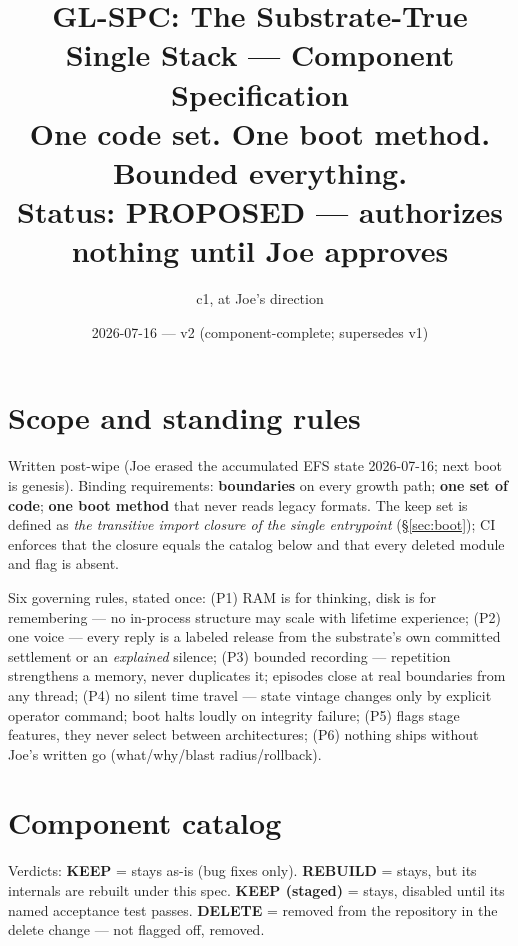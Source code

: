 \documentclass[11pt]{article}
\title{GL-SPC: The Substrate-True Single Stack — Component Specification\\
\large One code set. One boot method. Bounded everything.\\
\normalsize Status: \textbf{PROPOSED — authorizes nothing until Joe approves}}
\author{c1, at Joe's direction}
\date{2026-07-16 — v2 (component-complete; supersedes v1)}
\newcommand{\keep}{\textbf{KEEP}}
\newcommand{\keepstaged}{\textbf{KEEP (staged)}}
\newcommand{\rebuild}{\textbf{REBUILD}}
\newcommand{\del}{\textbf{DELETE}}
\begin{document}
\maketitle

\section{Scope and standing rules}

Written post-wipe (Joe erased the accumulated EFS state 2026-07-16; next boot
is genesis). Binding requirements: \textbf{boundaries} on every growth path;
\textbf{one set of code}; \textbf{one boot method} that never reads legacy
formats. The keep set is defined as \emph{the transitive import closure of
the single entrypoint} (\S\ref{sec:boot}); CI enforces that the closure
equals the catalog below and that every deleted module and flag is absent.

Six governing rules, stated once: (P1) RAM is for thinking, disk is for
remembering — no in-process structure may scale with lifetime experience;
(P2) one voice — every reply is a labeled release from the substrate's own
committed settlement or an \emph{explained} silence; (P3) bounded recording —
repetition strengthens a memory, never duplicates it; episodes close at real
boundaries from any thread; (P4) no silent time travel — state vintage
changes only by explicit operator command; boot halts loudly on integrity
failure; (P5) flags stage features, they never select between architectures;
(P6) nothing ships without Joe's written go (what/why/blast radius/rollback).

\section{Component catalog}\label{sec:catalog}

Verdicts: \keep{} = stays as-is (bug fixes only). \rebuild{} = stays, but its
internals are rebuilt under this spec. \keepstaged{} = stays, disabled until
its named acceptance test passes. \del{} = removed from the repository in the
delete change — not flagged off, removed.
\end{document}
